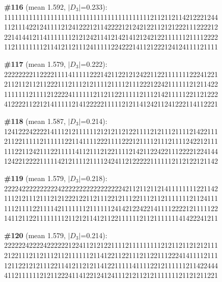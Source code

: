\documentclass[10pt]{article}
\begin{document}
\noindent\textbf{\#116} (mean 1.592, $|D_3|$=0.233):\\
111111111111111111111111111111111111111112112112114212221244\\
112111422124111121241222121142222121242122112121222111222212\\
221414412114111111121212421141214214121242122111111211112222\\
112111111112114121121112411111224222141121222124124111121111\medskip

\noindent\textbf{\#117} (mean 1.579, $|D_3|$=0.222):\\
222222221122221111411111222142112212124221122111111122241221\\
211211211211222111211121211112111121112221224211111121211422\\
111111121111212222411111121121122111112111214211111221121222\\
412222112212141111121412222211111212114124211241222114112221\medskip

\noindent\textbf{\#118} (mean 1.587, $|D_3|$=0.214):\\
124122242222141112121111112121211212211112121112111121422111\\
211221111121111112211411112221111222121111211121111242212111\\
111221124211122111114112111212211112142112242211122221224144\\
124221222211111421211112111124241121222221111112112122121142\medskip

\noindent\textbf{\#119} (mean 1.579, $|D_3|$=0.218):\\
222242222222222422222222222222222421121121121411111111221142\\
111212111211121212221221121112212111221112112111111121124111\\
111211112211114211111112111111241421224221411112222121111122\\
141121122111111112112121141211221111112112111111141422241211\medskip

\noindent\textbf{\#120} (mean 1.579, $|D_3|$=0.214):\\
222222422224222222122411212122111121111111112121121121212111\\
212211121121112112111111211412211221112112211122241411112111\\
121122121211122114121121211412211111411112212111111211422444\\
411211111121211222411412212412411121211212111111121121211221\medskip





\endgroup
\end{document}
